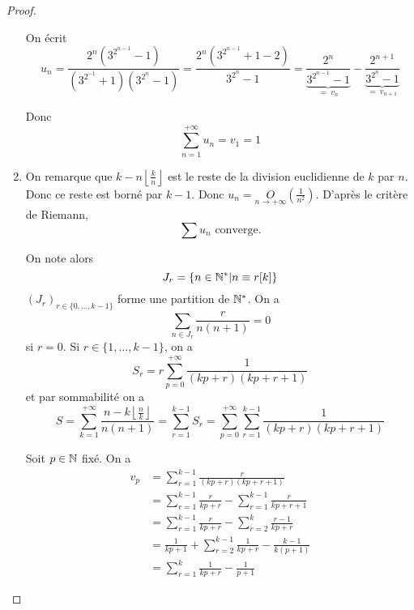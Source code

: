\documentclass[12pt]{article}
\begin{document}
\begin{proof}
\begin{enumerate}
		On écrit 
		\begin{equation*}u_{n}=\frac{2^{n}\left(3^{2^{n-1}}-1\right)}{\left(3^{2^{-1}}+1\right)\left(3^{2^{n}}-1\right)}=\frac{2^{n}\left(3^{2^{n-1}}+1-2\right)}{3^{2^{n}}-1}=\underbrace{\frac{2^{n}}{3^{2^{n-1}}-1}}_{=~v_{n}}-\underbrace{\frac{2^{n+1}}{3^{2^{n}}-1}}_{=~v_{n+1}}\end{equation*}

		Donc 
		\begin{equation*}\boxed{\sum_{n=1}^{+\infty}u_{n}=v_{1}=1}\end{equation*}

		\item On remarque que $k-n\left\lfloor\frac{k}{n}\right\rfloor$ est le reste de la division euclidienne de $k$ par $n$. Donc ce reste est borné par $k-1$. Donc $u_{n}=\underset{n\to+\infty}{O}\left(\frac{1}{n^{2}}\right)$. D'après le critère de Riemann,
		\begin{equation*}\boxed{\sum u_{n}\text{ converge.}}\end{equation*}

		On note alors 
		\begin{equation*}J_{r}=\left\{n\in\mathbb{N}^{*}\middle| n\equiv r[k]\right\}\end{equation*}
		$(J_{r})_{r\in\{0,\dots,k-1\}}$ forme une partition de $\mathbb{N}^{*}$. On a 
		\begin{equation*}\sum_{n\in J_{r}}\frac{r}{n(n+1)}=0\end{equation*}
		si $r=0$. Si $r\in\{1,\dots,k-1\}$, on a 
		\begin{equation*}S_{r}=r\sum_{p=0}^{+\infty}\frac{1}{(kp+r)(kp+r+1)}\end{equation*}
		et par sommabilité on a 
		\begin{equation*}S=\sum_{k=1}^{+\infty}\frac{n-k\left\lfloor\frac{n}{k}\right\rfloor}{n(n+1)}=\sum_{r=1}^{k-1}S_{r}=\sum_{p=0}^{+\infty}\sum_{r=1}^{k-1}\frac{1}{(kp+r)(kp+r+1)}\end{equation*}

		Soit $p\in\mathbb{N}$ fixé. On a 
		\begin{align*}
			v_{p}
			&=\sum_{r=1}^{k-1}\frac{r}{(kp+r)(kp+r+1)}\\
			&=\sum_{r=1}^{k-1}\frac{r}{kp+r}-\sum_{r=1}^{k-1}\frac{r}{kp+r+1}\\
			&=\sum_{r=1}^{k-1}\frac{r}{kp+r}-\sum_{r=2}^{k}\frac{r-1}{kp+r}\\
			&=\frac{1}{kp+1}+\sum_{r=2}^{k-1}\frac{1}{kp+r}-\frac{k-1}{k(p+1)}\\
			&=\sum_{r=1}^{k}\frac{1}{kp+r}-\frac{1}{p+1}
		\end{align*}


\end{enumerate}
\end{proof}
\end{document}
